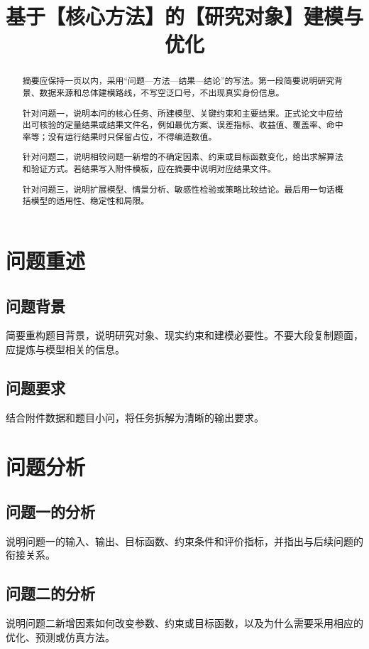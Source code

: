 \documentclass[withoutpreface,bwprint]{cumcmthesis}
\title{基于【核心方法】的【研究对象】建模与优化}
\begin{document}
\maketitle

\begin{abstract}
摘要应保持一页以内，采用“问题—方法—结果—结论”的写法。第一段简要说明研究背景、数据来源和总体建模路线，不写空泛口号，不出现真实身份信息。

针对问题一，说明本问的核心任务、所建模型、关键约束和主要结果。正式论文中应给出可核验的定量结果或结果文件名，例如最优方案、误差指标、收益值、覆盖率、命中率等；没有运行结果时只保留占位，不得编造数值。

针对问题二，说明相较问题一新增的不确定因素、约束或目标函数变化，给出求解算法和验证方式。若结果写入附件模板，应在摘要中说明对应结果文件。

针对问题三，说明扩展模型、情景分析、敏感性检验或策略比较结论。最后用一句话概括模型的适用性、稳定性和局限。

\end{abstract}

\section{问题重述}
\subsection{问题背景}
简要重构题目背景，说明研究对象、现实约束和建模必要性。不要大段复制题面，应提炼与模型相关的信息。

\subsection{问题要求}
结合附件数据和题目小问，将任务拆解为清晰的输出要求。

\section{问题分析}
\subsection{问题一的分析}
说明问题一的输入、输出、目标函数、约束条件和评价指标，并指出与后续问题的衔接关系。

\subsection{问题二的分析}
说明问题二新增因素如何改变参数、约束或目标函数，以及为什么需要采用相应的优化、预测或仿真方法。
\end{document}
